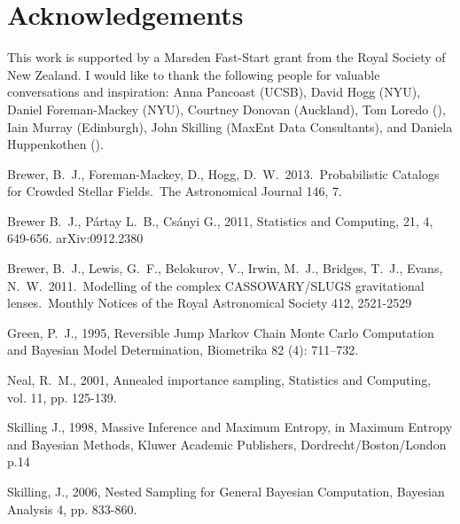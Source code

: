 \documentclass[letterpaper, 11pt]{article}
\begin{document}




\section*{Acknowledgements}
This work is supported by a Marsden Fast-Start grant
from the Royal Society of New Zealand. I would like to thank the following
people for valuable conversations and inspiration:
Anna Pancoast (UCSB), David Hogg (NYU), Daniel Foreman-Mackey (NYU),
Courtney Donovan (Auckland), Tom Loredo (), Iain Murray (Edinburgh),
John Skilling (MaxEnt Data Consultants), and Daniela Huppenkothen ().


\begin{thebibliography}{}

 Brewer, B.~J., 
Foreman-Mackey, D., Hogg, D.~W.\ 2013.\ Probabilistic Catalogs for Crowded 
Stellar Fields.\ The Astronomical Journal 146, 7. 

 Brewer B.~J., P{\'a}rtay L.~B., Cs{\'a}nyi G., 2011,
Statistics and Computing, 21, 4, 649-656. arXiv:0912.2380

 Brewer, B.~J., Lewis,
G.~F., Belokurov, V., Irwin, M.~J., Bridges, T.~J., Evans, N.~W.\ 2011.\
Modelling of the complex CASSOWARY/SLUGS gravitational lenses.\ Monthly
Notices of the Royal Astronomical Society 412, 2521-2529

Green, P.~J., 1995, Reversible Jump Markov Chain Monte Carlo Computation and Bayesian Model Determination, Biometrika 82 (4): 711–732.

 Neal, R.~M., 2001, 
Annealed importance sampling, Statistics and Computing, vol. 11, pp. 125-139.

Skilling J., 1998, Massive Inference and Maximum Entropy, in Maximum Entropy
and Bayesian Methods, Kluwer Academic Publishers, Dordrecht/Boston/London p.14

 Skilling, J., 2006, Nested Sampling for General Bayesian Computation, Bayesian Analysis 4, pp. 833-860.


\end{thebibliography}
\end{document}
